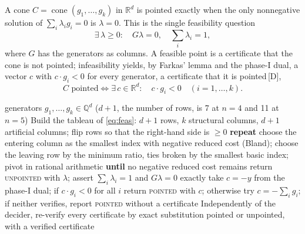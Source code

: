 \documentclass[11pt]{article}
\theoremstyle{definition}
\theoremstyle{remark}
\newcommand{\mk}[1]{\,{\scriptsize[#1]}}
\newcommand{\Dm}{\mk{D}}
\begin{document}
A cone $C=\operatorname{cone}(g_1,\dots,g_k)$ in $\mathbb{R}^d$ is pointed exactly when the only
nonnegative solution of $\sum_i\lambda_i g_i=0$ is $\lambda=0$. This is the single feasibility question
\begin{equation}\label{eq:feas}
\exists\,\lambda\ge 0:\quad G\lambda=0,\quad \textstyle\sum_i\lambda_i=1 ,
\end{equation}
where $G$ has the generators as columns. A feasible point is a certificate that the cone is not
pointed; infeasibility yields, by Farkas' lemma and the phase-I dual, a vector $c$ with
$c\cdot g_i<0$ for every generator, a certificate that it is pointed\Dm,
\begin{equation}\label{eq:dual}
\text{$C$ pointed}\iff\exists\,c\in\mathbb{R}^d:\quad c\cdot g_i<0\quad(i=1,\dots,k).
\end{equation}

\begin{algorithm}[t]
\caption{Exact pointedness of a comet (phase-I simplex over \texttt{Fraction}, Bland's rule).}\label{alg:lp}
\begin{algorithmic}[1]
\Require generators $g_1,\dots,g_k\in\mathbb{Q}^d$ ($d+1$, the number of rows, is 7 at $n=4$ and 11 at $n=5$)
\State Build the tableau of \eqref{eq:feas}: $d+1$ rows, $k$ structural columns, $d+1$ artificial columns; flip rows so that the right-hand side is $\ge 0$
\State \textbf{repeat} choose the entering column as the smallest index with negative reduced cost (Bland);
choose the leaving row by the minimum ratio, ties broken by the smallest basic index; pivot in rational arithmetic
\State \textbf{until} no negative reduced cost remains
  \State return \textsc{unpointed} with $\lambda$; assert $\sum_i\lambda_i=1$ and $G\lambda=0$ exactly
\Else
  \State take $c=-y$ from the phase-I dual; if $c\cdot g_i<0$ for all $i$ return \textsc{pointed} with $c$;
  otherwise try $c=-\sum_i g_i$; if neither verifies, report \textsc{pointed} without a certificate
\EndIf
\State Independently of the decider, re-verify every certificate by exact substitution
\Ensure pointed or unpointed, with a verified certificate
\end{algorithmic}
\end{algorithm}
\end{document}
